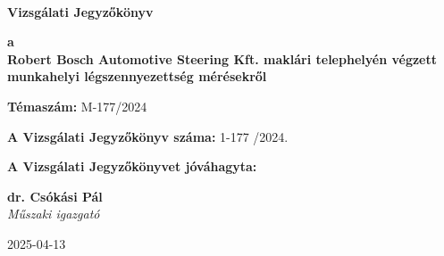 \documentclass[a4paper,12pt]{article}
\begin{document}
	
	
	\thispagestyle{firstpage}
	
	\begin{flushleft}
		{\footnotesize  
			\textbf{
				 \\
				\vspace{-2mm} 
			}
		}
	\end{flushleft}
	
	\vfill
	
	\begin{center}
		{\Huge \textbf{Vizsgálati Jegyzőkönyv}}
	\end{center}
	
	\vfill
	
	\begin{center}
		\large
		\textbf{a} \\
		\textbf{Robert Bosch Automotive Steering Kft. maklári telephelyén
végzett munkahelyi légszennyezettség mérésekről}
	\end{center}
	
	\vfill
	
	\begin{center}
		\textbf{Témaszám:} M-177/2024
	\end{center}    
	
	\vfill
	
	\begin{center}
		\textbf{A Vizsgálati Jegyzőkönyv száma:} 1-177 /2024.
	\end{center}
	
	\begin{center}
		\textbf{A Vizsgálati Jegyzőkönyvet jóváhagyta:}
	\end{center}    
	
	\vfill
	
	\begin{center}
		\textbf{dr. Csókási Pál}\\
		\textit{Műszaki igazgató} \\
	\end{center}    
	
	\vfill
	
	\begin{center}
		2025-04-13
	\end{center}    
	
	\vfill
	
\end{document}
